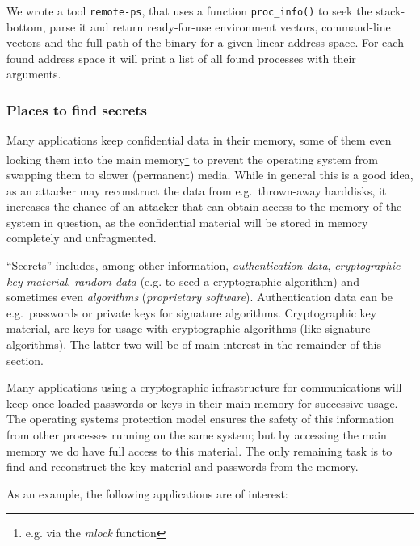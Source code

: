 We wrote a tool \texttt{remote-ps}, that uses a function \texttt{proc\_info()}
to seek the stack-bottom, parse it and return ready-for-use environment vectors,
command-line vectors and the full path of the binary for a given linear address
space.  For each found address space it will print a list of all found processes
with their arguments.



\subsubsection{Places to find secrets}

Many applications keep confidential data in their memory, some of them even
locking them into the main memory\footnote{e.g. via the \emph{mlock} function}
to prevent the operating system from swapping them to slower (permanent) media.
While in general this is a good idea, as an attacker may reconstruct the data
from e.g.~thrown-away harddisks, it increases the chance of an attacker that can
obtain access to the memory of the system in question, as the confidential
material will be stored in memory completely and unfragmented.

``Secrets'' includes, among other information, \emph{authentication data},
\emph{cryptographic key material}, \emph{random data} (e.g. to seed a
cryptographic algorithm) and sometimes even \emph{algorithms} (\emph{proprietary
software}). Authentication data can be e.g.~passwords or private keys for
signature algorithms. Cryptographic key material, are keys for usage with
cryptographic algorithms (like signature algorithms). The latter two will be of
main interest in the remainder of this section.

Many applications using a cryptographic infrastructure for communications will
keep once loaded passwords or keys in their main memory for successive usage.
The operating systems protection model ensures the safety of this information
from other processes running on the same system; but by accessing the main
memory we do have full access to this material. The only remaining task is to
find and reconstruct the key material and passwords from the memory.

As an example, the following applications are of interest:

